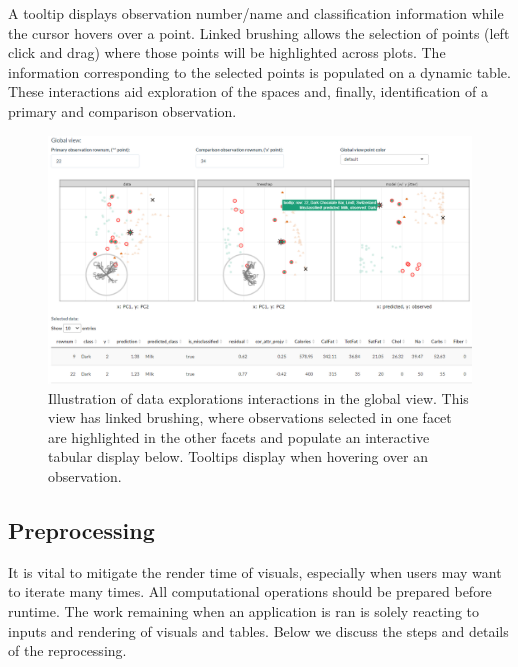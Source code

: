 \documentclass[
]{article}
\begin{document}
A tooltip displays observation number/name and classification information while the cursor hovers over a point. Linked brushing allows the selection of points (left click and drag) where those points will be highlighted across plots. The information corresponding to the selected points is populated on a dynamic table. These interactions aid exploration of the spaces and, finally, identification of a primary and comparison observation.

\begin{figure}

{\centering \includegraphics[width=1\linewidth]{./figures/app_interactions} 

}

\caption{Illustration of data explorations interactions in the global view. This view has linked brushing, where observations selected in one facet are highlighted in the other facets and populate an interactive tabular display below. Tooltips display when hovering over an observation.}\label{fig:interactions}
\end{figure}

\hypertarget{preprocessing}{%
\subsection{Preprocessing}\label{preprocessing}}

It is vital to mitigate the render time of visuals, especially when users may want to iterate many times. All computational operations should be prepared before runtime. The work remaining when an application is ran is solely reacting to inputs and rendering of visuals and tables. Below we discuss the steps and details of the reprocessing.
\end{document}
